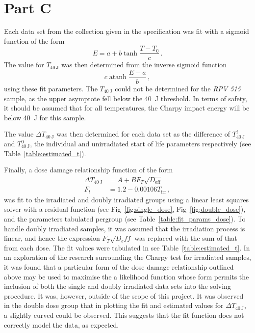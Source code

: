 \documentclass{article}
\begin{document}
    
    
    
\section{Part C}
    Each data set from the collection given in the specification was fit with a sigmoid function of the form
    \begin{equation}
    \label{eq:sigmoid}
        E=a + b\tanh{\frac{T-T_0}{c}}\,.
    \end{equation}
    The value for $T_{\SI{40}{\joule}}$ was then determined from the inverse sigmoid function 
    \begin{equation}
        c\operatorname{atanh}{\frac{E-a}{b}}\,,
    \end{equation}
    using these fit parameters. The $T_{\SI{40}{\joule}}$ could not be determined for the \textit{RPV 515} sample, as the upper asymptote fell below the \SI{40}{\joule} threshold. In terms of safety, it should be assumed that for all temperatures, the Charpy impact energy will be below \SI{40}{\joule} for this sample.
    
    The value $\Delta T_{\SI{40}{\joule}}$ was then determined for each data set as the difference of $T^i_{\SI{40}{\joule}}$ and $T^0_{\SI{40}{\joule}}$, the individual and unirradiated start of life parameters respectively (see Table~\ref{table:estimated_t}).
    
    Finally, a dose damage relationship function of the form 
    \begin{align}
    \label{eq:dose_damage}
    \Delta T_{\SI{40}{\joule}} &= A+B F_T\sqrt{D_{\text{eff}}} \\
    F_t &= 1.2 - 0.00106T_{\text{irr}}\,,
    \end{align}
    was fit to the irradiated and doubly irradiated groups using a linear least squares solver with a residual function (see Fig~\ref{fig:single_dose}, Fig~\ref{fig:double_dose}), and the parameters tabulated per\textendash group (see Table~\ref{table:fit_params_dose}). To handle doubly irradiated samples, it was assumed that the irradiation process is linear, and hence the expression $F_T\sqrt{D_eff}$ was replaced with the sum of that from each dose. The fit values were tabulated in see Table~\ref{table:estimated_t}. In an exploration of the research surrounding the Charpy test for irradiated samples, it was found that a particular form of the dose damage relationship outlined above may be used to maximise the a likelihood function whose form permits the inclusion of both the single and doubly irradiated data sets into the solving procedure. It was, however, outside of the scope of this project. It was observed in the double dose group that in plotting the fit and estimated values for $\Delta T_{\SI{40}{\joule}}$, a slightly curved could be observed. This suggests that the fit function does not correctly model the data, as expected.
    
\end{document}
